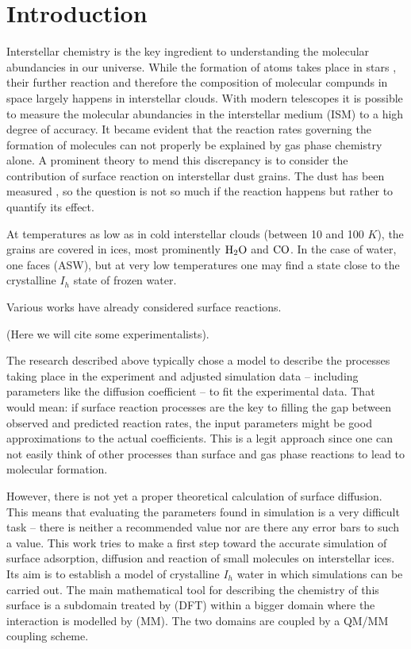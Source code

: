 \documentclass[8.5pt,twoside,twocolumn]{article}
\theoremstyle{standard}
\begin{document}
\section{Introduction}
\label{Sec:Intro}
Interstellar chemistry is the key ingredient to understanding the molecular abundancies in our universe. While
the formation of atoms takes place in stars \cite{AtomsInStars}, their further reaction and therefore the composition
of molecular compunds in space largely happens in interstellar clouds. With modern telescopes it is possible to
measure the molecular abundancies in the interstellar medium (ISM) to a high degree of accuracy. It became
evident that the reaction rates governing the formation of molecules can not properly be explained by gas phase
chemistry alone. A prominent theory to mend this discrepancy is to consider the contribution of surface reaction
on interstellar dust grains. The dust has been measured \cite{DustMeasure}, so the question is not so much if the
reaction happens but rather to quantify its effect.

At temperatures as low as in cold interstellar clouds (between 10 and 100 $K$), the grains are covered in ices,
most prominently $\text H _2 \text O $ and $\text C \text O$. In the case of water, one faces  (ASW), but
at very low temperatures one may find a state close to the crystalline $I_h$ state of frozen water.

Various works have already considered surface reactions.

(Here we will cite some experimentalists).

The research described above typically chose a model to describe the processes taking place in the experiment and
adjusted simulation data -- including parameters like the diffusion coefficient -- to fit the experimental data.
That would mean: if surface reaction processes are the key to filling the gap between observed and predicted
reaction rates, the input parameters might be good approximations to the actual coefficients. This is a legit
approach since one can not easily think of other processes than surface and gas phase reactions to lead to
molecular formation.

However, there is not yet a proper  theoretical calculation of surface diffusion. This means that
evaluating the parameters found in simulation is a very difficult task -- there is neither a recommended value nor 
are there any error bars to such a value. This work tries to make a first step toward the accurate simulation of surface
adsorption, diffusion and reaction of small molecules on interstellar ices. Its aim is to establish a model
of crystalline $I_h$ water in which simulations can be carried out. The main mathematical tool for describing the 
chemistry of this surface is a subdomain treated by  (DFT) within a bigger domain
where the interaction is modelled by  (MM). The two domains are coupled by a QM/MM
coupling scheme.
\end{document}
